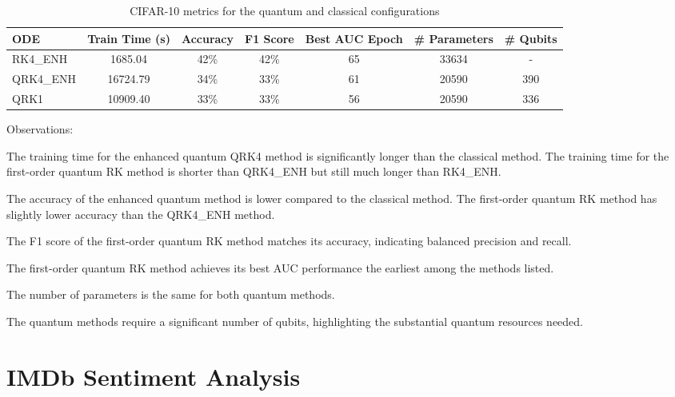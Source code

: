\documentclass[12pt,a4paper]{report}
\begin{document}
\clearpage

\begin{table}[th]\small\linespread{1}
  \label{tab:hybrid_MNIST}
  \centering
  \begin{tabular}{|l|c|c|c|c|c|c|}
    \hline
    \textbf{ODE} & \textbf{Train Time (s)} & \textbf{Accuracy} & \textbf{F1 Score} & \textbf{Best AUC Epoch} & \textbf{\# Parameters} & \textbf{\# Qubits} \\
    \hline
    RK4\_ENH     & 1685.04                 & 42\%              & 42\%              & 65                      & 33634                  & -                  \\
    QRK4\_ENH    & 16724.79                & 34\%              & 33\%              & 61                      & 20590                  & 390                \\
    QRK1         & 10909.40                & 33\%              & 33\%              & 56                      & 20590                  & 336                \\
    \hline
  \end{tabular}
  \caption{CIFAR-10 metrics for the quantum and classical configurations}
\end{table}

Observations:

The training time for the enhanced quantum QRK4 method is significantly longer than the classical method. The training time for the first-order quantum RK method is shorter than QRK4\_ENH but still much longer than RK4\_ENH.

The accuracy of the enhanced quantum method is lower compared to the classical method. The first-order quantum RK method has slightly lower accuracy than the QRK4\_ENH method.

The F1 score of the first-order quantum RK method matches its accuracy, indicating balanced precision and recall.

The first-order quantum RK method achieves its best AUC performance the earliest among the methods listed.

The number of parameters is the same for both quantum methods.

The quantum methods require a significant number of qubits, highlighting the substantial quantum resources needed.

\clearpage

\section{IMDb Sentiment Analysis}
\end{document}
